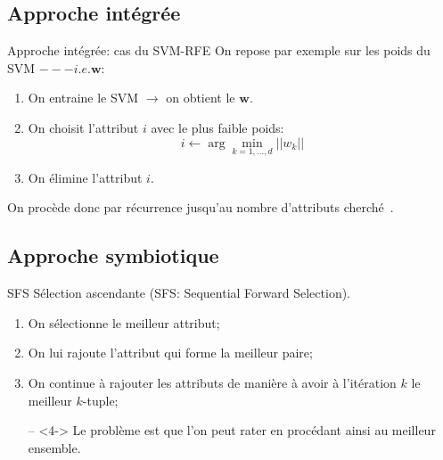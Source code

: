 \documentclass[9pt]{beamer}
\begin{document}
	\subsection[integrated approach]{Approche intégrée}
	\begin{frame}{Approche intégrée: cas du SVM-RFE}
		On repose par exemple sur les poids du SVM $ --- i.e. \textbf{w}$:
		\begin{enumerate}
			\item<1-> On entraine le SVM $\longrightarrow$ on obtient le $\textbf{w}$.
			\item<2-> On choisit l'attribut $i$ avec le plus faible poids:
			$$ i \leftarrow \arg \min_{k=1,\dots,d}{\vert\vert w_k\vert\vert}$$
			\item<3-> On élimine l'attribut $i$.
		\end{enumerate}
		On procède donc par récurrence jusqu'au nombre d'attributs cherché~\cite{Guyon2002}.
	\end{frame}

	\subsection[symbiotic approach]{Approche symbiotique}
	\begin{frame}{SFS}
		Sélection ascendante (SFS\@: Sequential Forward Selection).
		\begin{enumerate}
		\item<1-> On sélectionne le meilleur attribut;
		\item<2-> On lui rajoute l'attribut qui forme la meilleur paire;
		\item<3-> On continue à rajouter les attributs de manière à avoir à l'itération $k$ le meilleur $k$-tuple;
		\item[--]<4-> Le problème est que l'on peut rater en procédant ainsi au meilleur ensemble.
		\end{enumerate}
	\end{frame}
\end{document}
